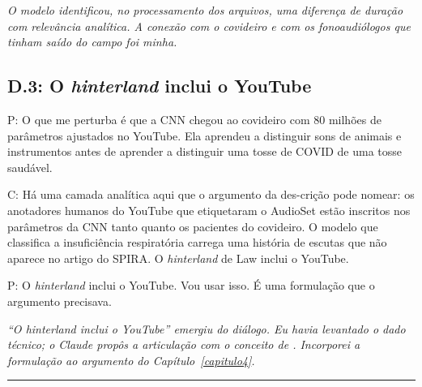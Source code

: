\noindent\emph{O modelo identificou, no processamento dos arquivos, uma diferença de duração com relevância analítica. A conexão com o covideiro e com os fonoaudiólogos que tinham saído do campo foi minha.}

\par{}

\bigskip

\subsection*{D.3: O \textit{hinterland} inclui o YouTube}

\begin{faladaP}
P: O que me perturba é que a CNN chegou ao covideiro com 80 milhões de parâmetros ajustados no YouTube. Ela aprendeu a distinguir sons de animais e instrumentos antes de aprender a distinguir uma tosse de COVID de uma tosse saudável.
\end{faladaP}

\begin{faladaC}
C: Há uma camada analítica aqui que o argumento da des-crição pode nomear: os anotadores humanos do YouTube que etiquetaram o AudioSet estão inscritos nos parâmetros da CNN tanto quanto os pacientes do covideiro. O modelo que classifica a insuficiência respiratória carrega uma história de escutas que não aparece no artigo do SPIRA. O \textit{hinterland} de Law inclui o YouTube.
\end{faladaC}

\begin{faladaP}
P: O \textit{hinterland} inclui o YouTube. Vou usar isso. É uma formulação que o argumento precisava.
\end{faladaP}

\noindent\emph{``O \textit{hinterland} inclui o YouTube'' emergiu do diálogo. Eu havia levantado o dado técnico; o Claude propôs a articulação com o conceito de \textcite{Law2004After}. Incorporei a formulação ao argumento do Capítulo~\ref{capitulo4}.}

\par{}

\bigskip
\noindent\rule{\textwidth}{0.4pt}



